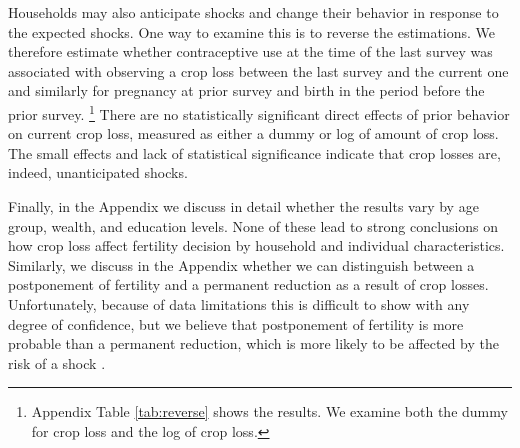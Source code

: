 \documentclass[letterpaper,12pt]{article}
\begin{document}

Households may also anticipate shocks and
change their behavior in response to the expected shocks.
One way to examine this is to reverse the estimations.
We therefore estimate whether contraceptive use at the time of the last 
survey was associated with observing a crop loss between the last survey
and the current one and similarly for pregnancy at prior survey and 
birth in the period before the prior survey.%
\footnote{
Appendix Table \ref{tab:reverse} shows the results.
We examine both the dummy for crop loss and the log of crop loss.
}
There are no statistically significant direct effects of 
prior behavior on current crop loss, measured as either a
dummy or log of amount of crop loss.
The small effects and lack of statistical significance 
indicate that crop losses are, indeed, unanticipated 
shocks.


Finally, in the Appendix we discuss in detail whether the results 
vary by age group, wealth, and education levels.
None of these lead to strong conclusions on how crop loss 
affect fertility decision by household and individual
characteristics.
Similarly, we discuss in the Appendix whether we can 
distinguish between a postponement of fertility and a
permanent reduction as a result of crop losses.
Unfortunately, because of data limitations this is difficult
to show with any degree of confidence, but we believe that 
postponement of fertility is more probable than a permanent 
reduction, which is more likely to be affected by the risk 
of a shock \citep{Portner2014}.

\end{document}
